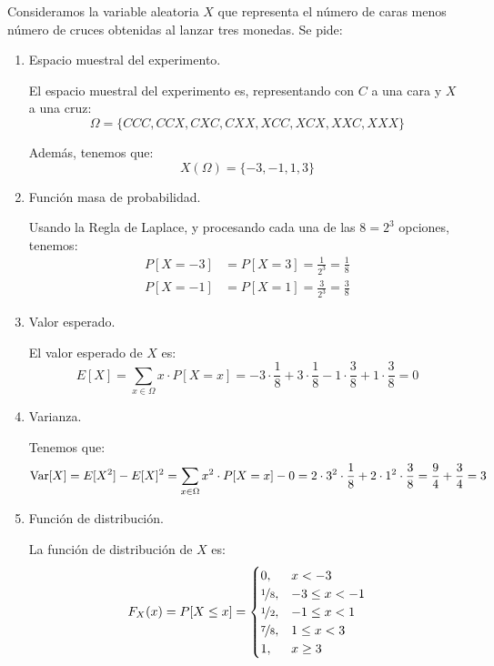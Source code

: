 \begin{ejercicio}
    Consideramos la variable aleatoria $X$ que representa el número de caras menos número de cruces obtenidas al lanzar tres monedas.
    Se pide:
    \begin{enumerate}
        \item Espacio muestral del experimento.
        
        El espacio muestral del experimento es, representando con $C$ a una cara y $X$ a una cruz:
        \begin{equation*}
            \Omega = \{CCC, CCX, CXC, CXX, XCC, XCX, XXC, XXX\}
        \end{equation*}

        Además, tenemos que:
        \begin{equation*}
            X(\Omega) = \{-3, -1, 1, 3\}
        \end{equation*}
        \item Función masa de probabilidad.
        
        Usando la Regla de Laplace, y procesando cada una de las $8=2^3$ opciones, tenemos:
        \begin{align*}
            P[X=-3] &= P[X=3] = \frac{1}{2^3} = \frac{1}{8}\\
            P[X=-1] &= P[X=1] = \frac{3}{2^3} = \frac{3}{8}
        \end{align*}

        \item Valor esperado.
        
        El valor esperado de $X$ es:
        \begin{equation*}
            E[X] = \sum_{x\in \Omega}x\cdot P[X=x] = -3\cdot \frac{1}{8} + 3\cdot \frac{1}{8} - 1\cdot \frac{3}{8} + 1\cdot \frac{3}{8} = 0
        \end{equation*}

        \item Varianza.
        
        Tenemos que:
        \begin{equation*}
            \operatorname{Var}[X] = E[X^2] - E[X]^2 = \sum_{x\in \Omega}x^2\cdot P[X=x] - 0 = 2\cdot 3^2\cdot \frac{1}{8} + 2\cdot 1^2\cdot \frac{3}{8} = \dfrac{9}{4} + \dfrac{3}{4} = 3
        \end{equation*}
        \item Función de distribución.
        
        La función de distribución de $X$ es:
        \begin{equation*}
            F_X(x) = P[X\leq x] = \begin{cases}
                0, & x<-3 \\
                \nicefrac{1}{8}, & -3\leq x < -1 \\
                \nicefrac{1}{2}, & -1\leq x < 1 \\
                \nicefrac{7}{8}, & 1\leq x < 3 \\
                1, & x\geq 3
            \end{cases}
        \end{equation*}


\end{enumerate}
\end{ejercicio}
